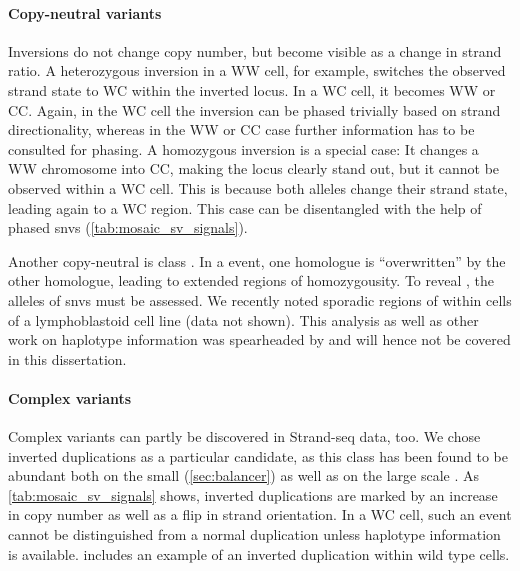 \paragraph{Copy-neutral variants}
Inversions do not change copy number, but become visible as a change in strand
ratio. A heterozygous inversion in a WW cell, for example, switches the observed strand
state to WC within the inverted locus. In a WC cell, it becomes WW or CC. Again,
in the WC cell the inversion can be phased trivially based on strand
directionality, whereas in the WW or CC case further \snv information has to be
consulted for phasing. A homozygous inversion is a special case: It changes a WW
chromosome into CC, making the locus clearly stand out, but it cannot be
observed within a WC cell. This is because both alleles change their strand
state, leading again to a WC region. This case can be disentangled with the help
of phased \acp{snv} (\cref{tab:mosaic_sv_signals}).

Another copy-neutral \sv is class \loh. In a \loh event, one homologue is
``overwritten'' by the other homologue, leading to extended regions of
homozygousity. To reveal \loh, the alleles of \acp{snv} must be assessed. We recently
noted sporadic regions of \loh within cells of a lymphoblastoid cell
line (data not shown). This analysis as well as other work on haplotype information
was spearheaded by \david and will hence not be covered in this
dissertation.

\paragraph{Complex variants}
Complex variants can partly be discovered in Strand-seq data, too. We chose
inverted duplications as a particular candidate, as this class has been found to
be abundant both on the small (\cref{sec:balancer}) as well as on the large
scale \citep{Chaisson2017}. As \cref{tab:mosaic_sv_signals} shows, inverted
duplications are marked by an increase in copy number as well as a flip in
strand orientation. In a WC cell, such an event cannot be distinguished from a
normal duplication unless haplotype information is available. 
includes an example of an inverted duplication within \rpe wild type cells.

